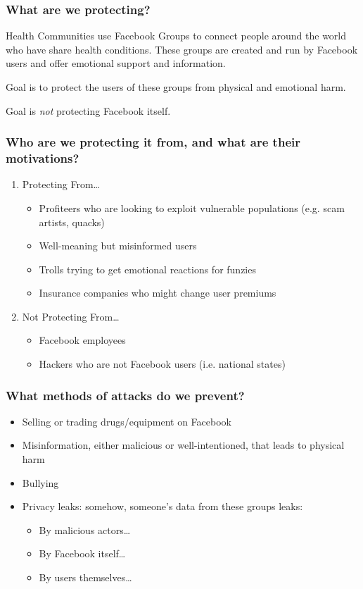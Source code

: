 \documentclass[letterpaper]{article}
\begin{document}
\subsubsection{What are we protecting?}
\label{sec:org283a4e8}
Health Communities use Facebook Groups to connect people around the world who have share health conditions. These groups are created and run by Facebook users and offer emotional support and information.

Goal is to protect the users of these groups from physical and emotional harm.

Goal is \emph{not} protecting Facebook itself.

\subsubsection{Who are we protecting it from, and what are their motivations?}
\label{sec:org7143d16}

\begin{enumerate}
\item Protecting From\ldots{}
\label{sec:org4a18874}
\begin{itemize}
\item Profiteers who are looking to exploit vulnerable populations (e.g. scam artists, quacks)
\item Well-meaning but misinformed users
\item Trolls trying to get emotional reactions for funzies
\item Insurance companies who might change user premiums
\end{itemize}

\item Not Protecting From\ldots{}
\label{sec:orgf53734b}
\begin{itemize}
\item Facebook employees
\item Hackers who are not Facebook users (i.e. national states)
\end{itemize}
\end{enumerate}

\subsubsection{What methods of attacks do we prevent?}
\label{sec:org332e3b7}
\begin{itemize}
\item Selling or trading drugs/equipment on Facebook
\item Misinformation, either malicious or well-intentioned, that leads to physical harm
\item Bullying
\item Privacy leaks: somehow, someone's data from these groups leaks:
\begin{itemize}
\item By malicious actors\ldots{}
\item By Facebook itself\ldots{}
\item By users themselves\ldots{}
\end{itemize}
\end{itemize}
\end{document}
